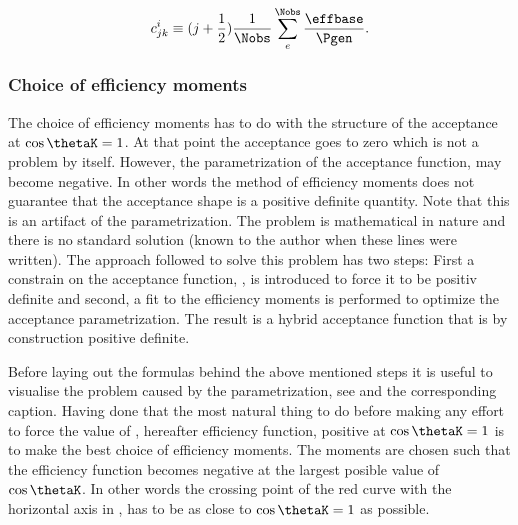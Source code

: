 \begin{equation}
\centering
 c^i_{jk} \equiv (j + \frac{1}{2})  \frac{1}{\Nobs} \sum_e^{\Nobs} \frac{\effbase}{\Pgen}.
  \label{eff_moms_calc_final}
\end{equation}


\subsubsection{Choice of efficiency moments}
The choice of efficiency moments has to do with the structure of the acceptance at $\cos\thetaK=1$. At that point the acceptance goes to zero
which is not a problem by itself. However, the parametrization of the acceptance function,  may become negative.
In other words the method of efficiency moments does not guarantee that the acceptance shape is a positive definite quantity.
Note that this is an artifact of the parametrization. The problem is mathematical in nature and there is no standard solution (known
to the author when these lines were written). The approach followed to solve this problem has two steps: First a constrain on the
acceptance function, , is introduced to force it to be positiv definite and second, a fit to the efficiency
moments is performed to optimize the acceptance parametrization. The result is a hybrid acceptance function that is by
construction positive definite.

Before laying out the formulas behind the above mentioned steps it is useful to visualise the problem caused by the parametrization, see 
and the corresponding caption. Having done that the most natural thing to do before making any effort to force the value of , hereafter efficiency function,
positive at $\cos\thetaK=1$ is to make the best choice of efficiency moments. The moments are chosen such that the efficiency function becomes negative
at the largest posible value of $\cos\thetaK$. In other words the crossing point of the red curve with the horizontal axis in ,
has to be as close to $\cos\thetaK=1$ as possible.

